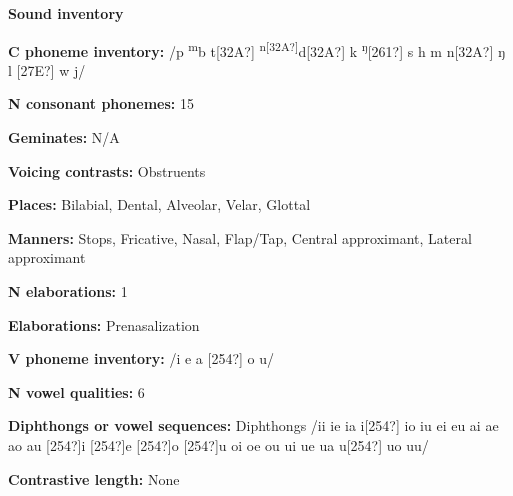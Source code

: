 \begin{styleBody}
\textbf{Sound inventory}
\end{styleBody}

\begin{styleBody}
\textbf{C phoneme inventory:} /p \textsuperscript{m}b t[32A?] \textsuperscript{n[32A?]}d[32A?] k \textsuperscript{ŋ}[261?] s h m n[32A?] ŋ l [27E?] w j/
\end{styleBody}

\begin{styleBody}
\textbf{N consonant phonemes:} 15
\end{styleBody}

\begin{styleBody}
\textbf{Geminates:} N/A
\end{styleBody}

\begin{styleBody}
\textbf{Voicing contrasts:} Obstruents
\end{styleBody}

\begin{styleBody}
\textbf{Places:} Bilabial, Dental, Alveolar, Velar, Glottal
\end{styleBody}

\begin{styleBody}
\textbf{Manners:} Stops, Fricative, Nasal, Flap/Tap, Central approximant, Lateral approximant
\end{styleBody}

\begin{styleBody}
\textbf{N elaborations:} 1
\end{styleBody}

\begin{styleBody}
\textbf{Elaborations:} Prenasalization
\end{styleBody}

\begin{styleBody}
\textbf{V phoneme inventory:} /i e a [254?] o u/
\end{styleBody}

\begin{styleBody}
\textbf{N vowel qualities:} 6
\end{styleBody}

\begin{styleBody}
\textbf{Diphthongs or vowel sequences:} Diphthongs /ii ie ia i[254?] io iu ei eu ai ae ao au [254?]i [254?]e [254?]o [254?]u oi oe ou ui ue ua u[254?] uo uu/
\end{styleBody}

\begin{styleBody}
\textbf{Contrastive length:} None
\end{styleBody}


